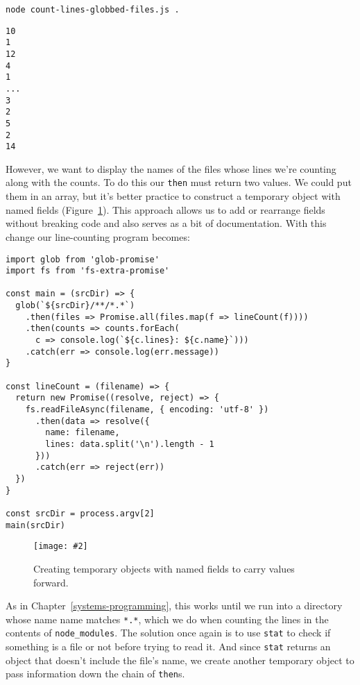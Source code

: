 \documentclass[krantzl]{krantz}
\newcommand{\figpdf}[4]{\begin{figure}%
\centering%
\texttt{[image: \#2]}%
\caption{#3}%
\label{#1}%
\end{figure}}
\newcommand{\chapref}[1]{Chapter~\ref{#1}}
\newcommand{\figref}[1]{Figure~\ref{#1}}
\begin{document}
\begin{lstlisting}[frame=single,frameround=tttt]
node count-lines-globbed-files.js .
\end{lstlisting}



\begin{lstlisting}[frame=single,frameround=tttt]
10
1
12
4
1
...
3
2
5
2
14
\end{lstlisting}



However,
we want to display the names of the files whose lines we're counting along with the counts.
To do this our \texttt{then} must return two values.
We could put them in an array,
but it's better practice to construct a temporary object with named fields
(\figref{async-programming-temporary-named-fields}).
This approach allows us to add or rearrange fields without breaking code
and also serves as a bit of documentation.
With this change
our line-counting program becomes:


\begin{lstlisting}[frame=single,frameround=tttt]
import glob from 'glob-promise'
import fs from 'fs-extra-promise'

const main = (srcDir) => {
  glob(`${srcDir}/**/*.*`)
    .then(files => Promise.all(files.map(f => lineCount(f))))
    .then(counts => counts.forEach(
      c => console.log(`${c.lines}: ${c.name}`)))
    .catch(err => console.log(err.message))
}

const lineCount = (filename) => {
  return new Promise((resolve, reject) => {
    fs.readFileAsync(filename, { encoding: 'utf-8' })
      .then(data => resolve({
        name: filename,
        lines: data.split('\n').length - 1
      }))
      .catch(err => reject(err))
  })
}

const srcDir = process.argv[2]
main(srcDir)
\end{lstlisting}


\figpdf{async-programming-temporary-named-fields}{./async-programming/temporary-named-fields.pdf}{Creating temporary objects with named fields to carry values forward.}{0.6}


As in \chapref{systems-programming},
this works until we run into a directory whose name name matches \texttt{*.*},
which we do when counting the lines in the contents of \texttt{node\_modules}.
The solution once again is to use \texttt{stat} to check if something is a file or not
before trying to read it.
And since \texttt{stat} returns an object that doesn't include the file's name,
we create another temporary object to pass information down the chain of \texttt{then}s.
\end{document}
